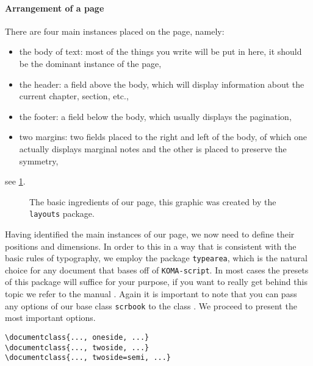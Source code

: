 \paragraph{Arrangement of a page} There are four main instances placed on the page, namely:
\begin{itemize}
\item the body of text: most of the things you write will be put in here, it should 
be the dominant instance of the page,
\item the header: a field above the body, which will display information about the 
current chapter, section, etc.,
\item the footer: a field below the body, which usually displays the pagination,
\item two margins: two fields placed to the right and left of the body, of which one 
actually displays marginal notes and the other is placed to preserve the symmetry,
\end{itemize}
see \cref{fig:play}. 
\begin{figure}
\currentpage
{}
\printheadingsfalse
\printparametersfalse
\marginparswitchtrue
\pagedesign
\caption{The basic ingredients of our page, this graphic was created by the 
		\texttt{layouts} package.} \label{fig:play}
\end{figure}
Having identified the main instances of our page, we now need to 
define their positions and dimensions. In order to this in a way that is consistent with 
the basic rules of typography, we employ the package \texttt{typearea}, which is the 
natural choice for any document that bases off of \texttt{KOMA-script}. 
In most cases the presets of this package will suffice for your purpose, if you want to 
really get behind this topic we refer to the manual \cite{koma20}. Again it is important 
to note that you can pass any options of our base class \texttt{scrbook} to the class 
\texttt{\classname}. We proceed to present the most important options.
\begin{emphBox}
\lstinline[language={[LaTeX]TeX}]|\documentclass{..., oneside, ...}|\\
\lstinline[language={[LaTeX]TeX}]|\documentclass{..., twoside, ...}|\\
\lstinline[language={[LaTeX]TeX}]|\documentclass{..., twoside=semi, ...}|
\end{emphBox}
